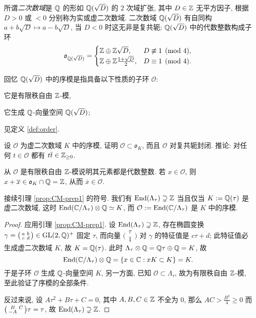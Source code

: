 所谓\emph{二次数域}是 $\mathbb{Q}$ 的形如 $\mathbb{Q}(\sqrt{D})$ 的 $2$ 次域扩张, 其中 $D \in \mathbb{Z}$ 无平方因子, 根据 $D > 0$ 或 $< 0$ 分别称为实或虚二次数域. 二次数域 $\mathbb{Q}(\sqrt{D})$ 有自同构 $a + b\sqrt{D} \mapsto a - b\sqrt{D}$, 当 $D < 0$ 时这无非是复共轭; $\mathbb{Q}(\sqrt{D})$ 中的代数整数构成子环
\[ \mathfrak{o}_{\mathbb{Q}(\sqrt{D})} = \begin{cases}
	\mathbb{Z} \oplus \mathbb{Z}\sqrt{D}, & D \not\equiv 1 \pmod{4}, \\
	\mathbb{Z} \oplus \mathbb{Z}\frac{1 + \sqrt{D}}{2}, & D \equiv 1 \pmod{4}.
\end{cases}\]

回忆 $\mathbb{Q}(\sqrt{D})$ 中的序模是指具备以下性质的子环 $\mathcal{O}$:
\begin{inparaenum}[(a)]
	\item 它是有限秩自由 $\mathbb{Z}$-模,
	\item 它生成 $\mathbb{Q}$-向量空间 $\mathbb{Q}(\sqrt{D})$;
\end{inparaenum}
见定义 \ref{def:order}.

\begin{exercise}\label{exo:order-integral}
	设 $\mathcal{O}$ 为虚二次数域 $K$ 中的序模, 证明 $\mathcal{O} \subset \mathfrak{o}_K$, 而且 $\mathcal{O}$ 对复共轭封闭. 推论: 对任何 $t \in \mathcal{O}$ 都有 $t\overline{t} \in \mathbb{Z}_{\geq 0}$.
	
	\begin{hint}
		从 $\mathcal{O}$ 是有限秩自由 $\mathbb{Z}$-模说明其元素都是代数整数. 若 $x \in \mathcal{O}$, 则 $x + \overline{x} \in \mathfrak{o}_K \cap \mathbb{Q} = \mathbb{Z}$, 从而 $\overline{x} \in \mathcal{O}$.
	\end{hint}
\end{exercise}

\begin{lemma}\label{prop:CM-prep2} 
	接续引理 \ref{prop:CM-prep1} 的符号. 我们有 $\operatorname{End}(\Lambda_\tau) \supsetneq \mathbb{Z}$ 当且仅当 $K := \mathbb{Q}(\tau)$ 是虚二次数域, 这时 $\operatorname{End}(\mathbb{C}/\Lambda_\tau) \otimes \mathbb{Q} \simeq K$, 而 $\mathcal{O} := \operatorname{End}(\mathbb{C}/\Lambda_\tau)$ 是 $K$ 中的序模.
\end{lemma}
\begin{proof}
	应用引理 \ref{prop:CM-prep1}. 设 $\operatorname{End}(\Lambda_\tau) \supsetneq \mathbb{Z}$, 存在椭圆变换 $\gamma = \bigl(\begin{smallmatrix} a & b \\ c & d \end{smallmatrix}\bigr) \in \operatorname{GL}(2, \mathbb{Q})^+$ 固定 $\tau$, 而向量 $\bigl( \begin{smallmatrix} \tau \\ 1 \end{smallmatrix} \bigr)$ 对 $\gamma$ 的特征值是 $c\tau + d$; 此特征值必生成虚二次数域 $K$, 故 $K = \mathbb{Q}(\tau)$. 此时 $\Lambda_\tau \otimes \mathbb{Q} = \mathbb{Q}\tau \oplus \mathbb{Q} = K$, 故
	\[ \operatorname{End}(\mathbb{C}/\Lambda_\tau) \otimes \mathbb{Q} = \left\{ x \in \mathbb{C}: x K \subset K \right\} = K. \]
	于是子环 $\mathcal{O}$ 生成 $\mathbb{Q}$-向量空间 $K$, 另一方面, 已知 $\mathcal{O} \subset \Lambda_\tau$, 故为有限秩自由 $\mathbb{Z}$-模, 至此验证了序模的全部条件.
	
	反过来说, 设 $A\tau^2 + B\tau + C = 0$, 其中 $A, B, C \in \mathbb{Z}$ 不全为 $0$, 那么 $AC > \frac{B^2}{4} \geq 0$ 而 $\bigl(\begin{smallmatrix} B & C \\ -A &  \end{smallmatrix}\bigr) \tau = \tau$, 故 $\operatorname{End}(\Lambda_\tau) \supsetneq \mathbb{Z}$. 
\end{proof}

